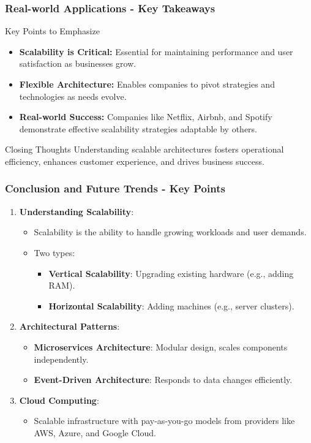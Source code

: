 \documentclass{beamer}
\begin{document}
\begin{frame}[fragile]
    \frametitle{Real-world Applications - Key Takeaways}
    \begin{block}{Key Points to Emphasize}
        \begin{itemize}
            \item \textbf{Scalability is Critical:} Essential for maintaining performance and user satisfaction as businesses grow.
            \item \textbf{Flexible Architecture:} Enables companies to pivot strategies and technologies as needs evolve.
            \item \textbf{Real-world Success:} Companies like Netflix, Airbnb, and Spotify demonstrate effective scalability strategies adaptable by others.
        \end{itemize}
    \end{block}
    \begin{block}{Closing Thoughts}
        Understanding scalable architectures fosters operational efficiency, enhances customer experience, and drives business success.
    \end{block}
\end{frame}

\begin{frame}[fragile]
    \frametitle{Conclusion and Future Trends - Key Points}
    \begin{enumerate}
        \item \textbf{Understanding Scalability}:
        \begin{itemize}
            \item Scalability is the ability to handle growing workloads and user demands.
            \item Two types: 
            \begin{itemize}
                \item \textbf{Vertical Scalability}: Upgrading existing hardware (e.g., adding RAM).
                \item \textbf{Horizontal Scalability}: Adding machines (e.g., server clusters).
            \end{itemize}
        \end{itemize}
        
        \item \textbf{Architectural Patterns}:
        \begin{itemize}
            \item \textbf{Microservices Architecture}: Modular design, scales components independently.
            \item \textbf{Event-Driven Architecture}: Responds to data changes efficiently.
        \end{itemize}
        
        \item \textbf{Cloud Computing}:
        \begin{itemize}
            \item Scalable infrastructure with pay-as-you-go models from providers like AWS, Azure, and Google Cloud.
        \end{itemize}
    \end{enumerate}
\end{frame}
\end{document}
